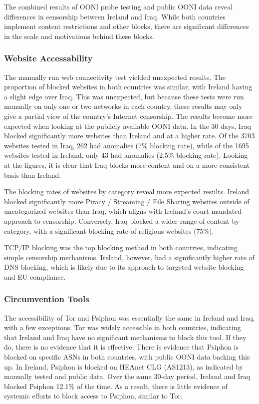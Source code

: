 The combined results of OONI probe testing and public OONI data reveal differences in censorship between Ireland and Iraq. While both countries implement content restrictions and other blocks, there are significant differences in the scale and motivations behind these blocks.

\subsubsection{Website Accessability}
\label{sec:Website-Accessability-Analysis}

The manually run web connectivity test yielded unexpected results. The proportion of blocked websites in both countries was similar, with Ireland having a slight edge over Iraq. This was unexpected, but because these tests were run manually on only one or two networks in each country, these results may only give a partial view of the country's Internet censorship. The results become more expected when looking at the publicly available OONI data. In the 30 days, Iraq blocked significantly more websites than Ireland and at a higher rate. Of the 3703 websites tested in Iraq, 262 had anomalies (7\% blocking rate), while of the 1695 websites tested in Ireland, only 43 had anomalies (2.5\% blocking rate). Looking at the figures, it is clear that Iraq blocks more content and on a more consistent basis than Ireland.

The blocking rates of websites by category reveal more expected results. Ireland blocked significantly more Piracy / Streaming / File Sharing websites outside of uncategorized websites than Iraq, which aligns with Ireland's court-mandated approach to censorship. Conversely, Iraq blocked a wider range of content by category, with a significant blocking rate of religious websites (75\%).

TCP/IP blocking was the top blocking method in both countries, indicating simple censorship mechanisms. Ireland, however, had a significantly higher rate of DNS blocking, which is likely due to its approach to targeted website blocking and EU compliance.

\subsubsection{Circumvention Tools}

The accessibility of Tor and Psiphon was essentially the same in Ireland and Iraq, with a few exceptions. Tor was widely accessible in both countries, indicating that Ireland and Iraq have no significant mechanisms to block this tool. If they do, there is no evidence that it is effective. There is evidence that Psiphon is blocked on specific ASNs in both countries, with public OONI data backing this up. In Ireland, Psiphon is blocked on HEAnet CLG (AS1213), as indicated by manually tested and public data. Over the same 30-day period, Ireland and Iraq blocked Psiphon 12.1\% of the time. As a result, there is little evidence of systemic efforts to block access to Psiphon, similar to Tor.

